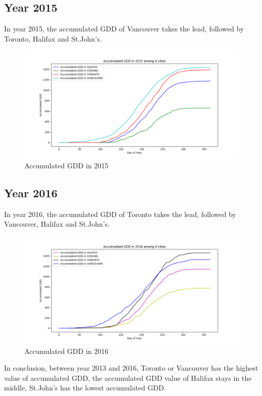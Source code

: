 \documentclass[12pt]{article}
\begin{document}
\subsection{Year 2015}
In year 2015, the accumulated GDD of Vancouver takes the lead, followed by Toronto, Halifax and St.John's.
\begin{figure}[H]
\includegraphics[width=5.25in]{../Plot/accGDD_2015.png}



\caption{Accumulated GDD in 2015}
\label{7}
\end{figure}

\subsection{Year 2016}
In year 2016, the accumulated GDD of Toronto takes the lead, followed by Vancouver, Halifax and St.John's.
\begin{figure}[H]
\includegraphics[width=5.25in]{../Plot/accGDD_2016.png}



\caption{Accumulated GDD in 2016}
\label{8}
\end{figure}

In conclusion, between year 2013 and 2016, Toronto or Vancouver has the highest value of accumulated GDD, the accumulated GDD value of Halifax stays in the middle, St.John's has the lowest accumulated GDD. 
\end{document}
